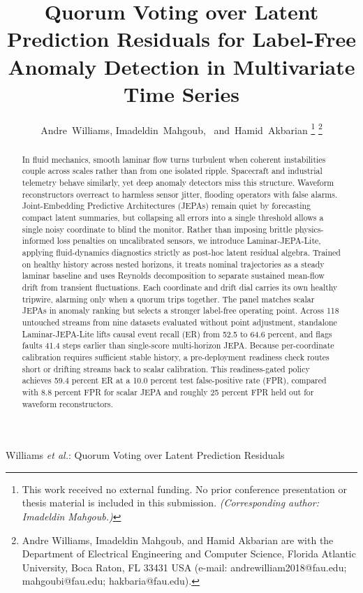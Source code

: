 \documentclass[journal]{IEEEtran}
\begin{document}
\title{Quorum Voting over Latent Prediction Residuals for Label-Free Anomaly Detection in Multivariate Time Series}

\author{Andre~Williams, Imadeldin~Mahgoub,~ and~Hamid~Akbarian%
\thanks{This work received no external funding. No prior conference presentation or thesis material is included in this submission. \textit{(Corresponding author: Imadeldin Mahgoub.)}}%
\thanks{Andre Williams, Imadeldin Mahgoub, and Hamid Akbarian are with the Department of Electrical Engineering and Computer Science, Florida Atlantic University, Boca Raton, FL 33431 USA (e-mail: andrewilliam2018@fau.edu; mahgoubi@fau.edu; hakbaria@fau.edu).}}%

%
{Williams \MakeLowercase{\textit{et al.}}: Quorum Voting over Latent Prediction Residuals}

\maketitle

\begin{abstract}
In fluid mechanics, smooth laminar flow turns turbulent when coherent instabilities couple across scales rather than from one isolated ripple. Spacecraft and industrial telemetry behave similarly, yet deep anomaly detectors miss this structure. Waveform reconstructors overreact to harmless sensor jitter, flooding operators with false alarms. Joint-Embedding Predictive Architectures (JEPAs) remain quiet by forecasting compact latent summaries, but collapsing all errors into a single threshold allows a single noisy coordinate to blind the monitor. Rather than imposing brittle physics-informed loss penalties on uncalibrated sensors, we introduce Laminar-JEPA-Lite, applying fluid-dynamics diagnostics strictly as post-hoc latent residual algebra. Trained on healthy history across nested horizons, it treats nominal trajectories as a steady laminar baseline and uses Reynolds decomposition to separate sustained mean-flow drift from transient fluctuations. Each coordinate and drift dial carries its own healthy tripwire, alarming only when a quorum trips together. The panel matches scalar JEPAs in anomaly ranking but selects a stronger label-free operating point. Across 118 untouched streams from nine datasets evaluated without point adjustment, standalone Laminar-JEPA-Lite lifts causal event recall (ER) from 52.5 to 64.6 percent, and flags faults 41.4 steps earlier than single-score multi-horizon JEPA. Because per-coordinate calibration requires sufficient stable history, a pre-deployment readiness check routes short or drifting streams back to scalar calibration. This readiness-gated policy achieves 59.4 percent ER at a 10.0 percent test false-positive rate (FPR), compared with 8.8 percent FPR for scalar JEPA and roughly 25 percent FPR held out for waveform reconstructors.
\end{abstract}
\end{document}
